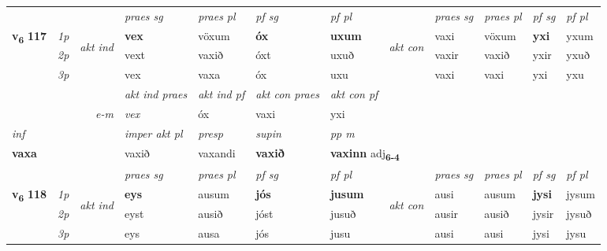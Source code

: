 \begin{longtable}[l]{X>{\footnotesize\itshape}llXXXXlXXXX}
\midrule

 & &   & \textit{praes sg}  & \textit{praes pl}    & \textit{ pf sg} & \textit{pf pl} & & \textit{praes sg}  & \textit{praes pl}    & \textit{pf sg} & \textit{pf pl }  \\ \cmidrule{4-7} \cmidrule{9-12}
 \multirow{2}{*}{{{\textbf{v{\textsubscript{6}}} \Large{\textbf{117}}}}}  & 1p & \multirow{3}{*}{\begin{turn}{90}\textit{akt ind}\end{turn}} & \textbf{vex} & vöxum & \textbf{óx} & \textbf{uxum} & \multirow{3}{*}{\begin{turn}{90}\textit{akt con}\end{turn}} &vaxi & vöxum & \textbf{yxi} & yxum\\*
 & 2p &  &  vext  & vaxið & óxt & uxuð & & vaxir & vaxið & yxir & yxuð \\*
 & 3p &  & vex & vaxa & óx & uxu & & vaxi & vaxi& yxi & yxu \\*
\cmidrule{4-7} \cmidrule{9-12}

   && &  \textit{akt ind praes} & \textit{akt ind pf} & \textit{akt con praes} & \textit{akt con pf} \\*
\multicolumn{3}{r}{\textit{e-m}} & vex & óx & vaxi & yxi \\*

\cmidrule{4-7}
   {\textit{inf}} & &  & \textit{imper akt pl}   & \textit{presp} & \textit{supin}  & \textit{pp m} \\*
  {\textbf{vaxa}} & &  & vaxið   & vaxandi &  \textbf{vaxið}  & \multicolumn{2}{l}{\textbf{vaxinn} adj\textbf{\textsubscript{6-4}}} \\*

\midrule

 & &   & \textit{praes sg}  & \textit{praes pl}    & \textit{ pf sg} & \textit{pf pl} & & \textit{praes sg}  & \textit{praes pl}    & \textit{pf sg} & \textit{pf pl }  \\ \cmidrule{4-7} \cmidrule{9-12}
 \multirow{2}{*}{{{\textbf{v{\textsubscript{6}}} \Large{\textbf{118}}}}}  & 1p & \multirow{3}{*}{\begin{turn}{90}\textit{akt ind}\end{turn}} & \textbf{eys} & ausum & \textbf{jós} & \textbf{jusum} & \multirow{3}{*}{\begin{turn}{90}\textit{akt con}\end{turn}} &ausi & ausum & \textbf{jysi} & jysum\\*
 & 2p &  &  eyst  & ausið & jóst & jusuð & & ausir & ausið & jysir & jysuð \\*
 & 3p &  & eys & ausa & jós & jusu & & ausi & ausi& jysi & jysu \\*
\cmidrule{4-7} \cmidrule{9-12}


\end{longtable}
